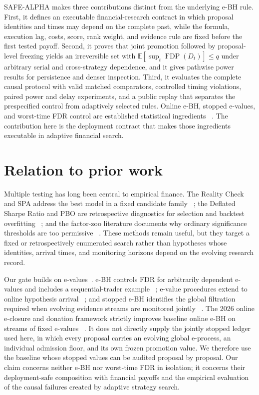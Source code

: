 SAFE-ALPHA makes three contributions distinct from the underlying e-BH rule.
First, it defines an executable financial-research contract in which proposal
identities and times may depend on the complete past, while the formula,
execution lag, costs, score, rank weight, and evidence rule are fixed before
the first tested payoff.  Second, it proves that joint promotion followed by
proposal-level freezing yields an irreversible set with
\(\mathbb E[\sup_t\operatorname{FDP}(D_t)]\le q\) under arbitrary serial and
cross-strategy dependence, and it gives pathwise power results for persistence
and denser inspection.  Third, it evaluates the complete causal protocol with
valid matched comparators, controlled timing violations, paired power and
delay experiments, and a public replay that separates the prespecified
control from adaptively selected rules.  Online e-BH, stopped e-values, and
worst-time FDR control are established statistical ingredients
~\cite{fischer2024online,wang2025stopped}.  The contribution here is the
deployment contract that makes those ingredients executable in adaptive
financial search.

\section{Relation to prior work}
\label{sec:related}

Multiple testing has long been central to empirical finance.  The Reality
Check and SPA address the best model in a fixed candidate family
~\cite{white2000reality,hansen2005spa}; the Deflated Sharpe Ratio and PBO are
retrospective diagnostics for selection and backtest overfitting
~\cite{bailey2014deflated,bailey2017pbo}; and the factor-zoo literature
documents why ordinary significance thresholds are too permissive
~\cite{harvey2016crosssection}.  These methods remain useful, but they target
a fixed or retrospectively enumerated search rather than hypotheses whose
identities, arrival times, and monitoring horizons depend on the evolving
research record.

Our gate builds on e-values~\cite{vovk2021evalues}.  e-BH controls FDR for
arbitrarily dependent e-values and includes a sequential-trader example
~\cite{wang2022false}; e-value procedures extend to online hypothesis arrival
~\cite{xu2024online,fischer2024online}; and stopped e-BH identifies the global
filtration required when evolving evidence streams are monitored jointly
~\cite{wang2025stopped}.  The 2026 online e-closure and donation framework
strictly improves baseline online e-BH on streams of fixed e-values
~\cite{xu2026closure}.  It does not directly supply the jointly stopped ledger
used here, in which every proposal carries an evolving global e-process, an
individual admission floor, and its own frozen promotion value.  We therefore
use the baseline whose stopped values can be audited proposal by proposal.
Our claim concerns neither e-BH nor worst-time FDR in isolation; it concerns
their deployment-safe composition with financial payoffs and the empirical
evaluation of the causal failures created by adaptive strategy search.

